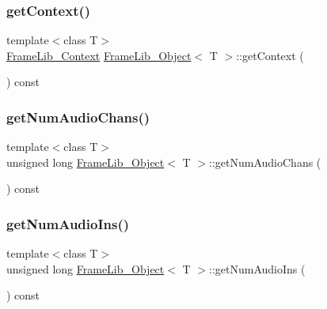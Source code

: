 \mbox{\label{class_frame_lib___object_a8f636902888847c78cf16d74717bd861}} 
\subsubsection{\texorpdfstring{get\+Context()}{getContext()}}
{\footnotesize\ttfamily template$<$class T$>$ \\
\hyperlink{class_frame_lib___context}{Frame\+Lib\+\_\+\+Context} \hyperlink{class_frame_lib___object}{Frame\+Lib\+\_\+\+Object}$<$ T $>$\+::get\+Context (\begin{DoxyParamCaption}{ }\end{DoxyParamCaption}) const\hspace{0.3cm}{\ttfamily [inline]}}

\mbox{\label{class_frame_lib___object_a59e6e7dba2d18444be6d5fbee15c73f2}} 
\subsubsection{\texorpdfstring{get\+Num\+Audio\+Chans()}{getNumAudioChans()}}
{\footnotesize\ttfamily template$<$class T$>$ \\
unsigned long \hyperlink{class_frame_lib___object}{Frame\+Lib\+\_\+\+Object}$<$ T $>$\+::get\+Num\+Audio\+Chans (\begin{DoxyParamCaption}{ }\end{DoxyParamCaption}) const\hspace{0.3cm}{\ttfamily [inline]}}

\mbox{\label{class_frame_lib___object_ad29b6281916a933c5baa43cbb7d11efd}} 
\subsubsection{\texorpdfstring{get\+Num\+Audio\+Ins()}{getNumAudioIns()}}
{\footnotesize\ttfamily template$<$class T$>$ \\
unsigned long \hyperlink{class_frame_lib___object}{Frame\+Lib\+\_\+\+Object}$<$ T $>$\+::get\+Num\+Audio\+Ins (\begin{DoxyParamCaption}{ }\end{DoxyParamCaption}) const\hspace{0.3cm}{\ttfamily [inline]}}

